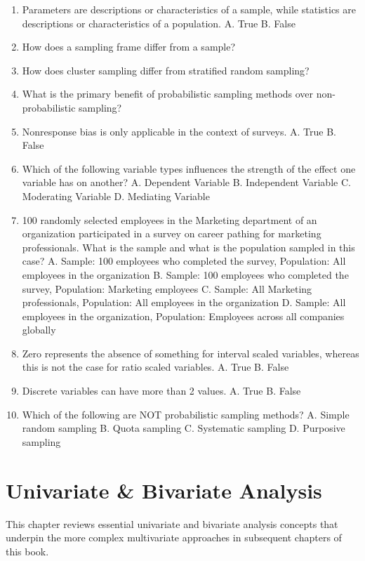 \documentclass[]{book}
\begin{document}
\begin{enumerate}
\def\labelenumi{\arabic{enumi}.}
\item
  Parameters are descriptions or characteristics of a sample, while statistics are descriptions or characteristics of a population.
  A. True
  B. False
\item
  How does a sampling frame differ from a sample?
\item
  How does cluster sampling differ from stratified random sampling?
\item
  What is the primary benefit of probabilistic sampling methods over non-probabilistic sampling?
\item
  Nonresponse bias is only applicable in the context of surveys.
  A. True
  B. False
\item
  Which of the following variable types influences the strength of the effect one variable has on another?
  A. Dependent Variable
  B. Independent Variable
  C. Moderating Variable
  D. Mediating Variable
\item
  100 randomly selected employees in the Marketing department of an organization participated in a survey on career pathing for marketing professionals. What is the sample and what is the population sampled in this case?
  A. Sample: 100 employees who completed the survey, Population: All employees in the organization
  B. Sample: 100 employees who completed the survey, Population: Marketing employees
  C. Sample: All Marketing professionals, Population: All employees in the organization
  D. Sample: All employees in the organization, Population: Employees across all companies globally
\item
  Zero represents the absence of something for interval scaled variables, whereas this is not the case for ratio scaled variables.
  A. True
  B. False
\item
  Discrete variables can have more than 2 values.
  A. True
  B. False
\item
  Which of the following are NOT probabilistic sampling methods?
  A. Simple random sampling
  B. Quota sampling
  C. Systematic sampling
  D. Purposive sampling
\end{enumerate}

\hypertarget{uni-bi-stats}{%
\chapter{Univariate \& Bivariate Analysis}\label{uni-bi-stats}}

This chapter reviews essential univariate and bivariate analysis concepts that underpin the more complex multivariate approaches in subsequent chapters of this book.
\end{document}
